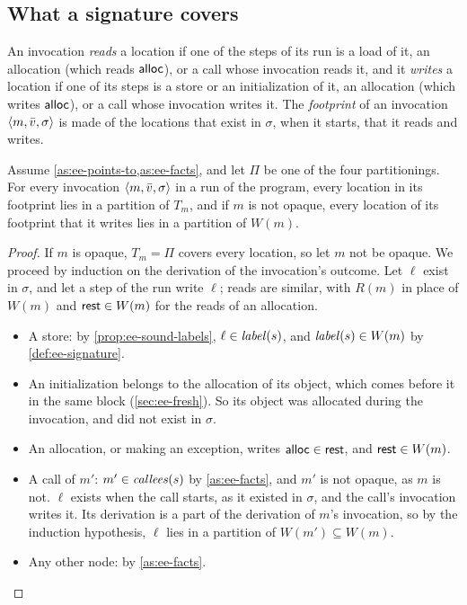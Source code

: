 \subsection{What a signature covers}

\begin{definition}[Footprint]\label{def:ee-footprint}
An invocation \emph{reads} a location if one of the steps of its run is a load
of it, an allocation (which reads $\mathsf{alloc}$), or a call whose invocation reads
it, and it \emph{writes} a location if one of its steps is a store or an
initialization of it, an allocation (which writes $\mathsf{alloc}$), or a call whose
invocation writes it. The \emph{footprint} of an invocation
$\langle m, \bar v, \sigma \rangle$ is made of the locations that exist in $\sigma$, when
it starts, that it reads and writes.
\end{definition}

\begin{theorem}[Signatures]\label{thm:ee-signatures}
Assume \cref{as:ee-points-to,as:ee-facts}, and let $\Pi$ be one of the four
partitionings. For every invocation $\langle m, \bar v, \sigma \rangle$ in a run of the
program, every location in its footprint lies in a partition of $T_m$, and if
$m$ is not opaque, every location of its footprint that it writes lies in a
partition of $W(m)$.
\end{theorem}

\begin{proof}
If $m$ is opaque, $T_m = \Pi$ covers every location, so let $m$ not be opaque.
We proceed by induction on the derivation of the invocation's outcome. Let
$\ell$ exist in $\sigma$, and let a step of the run write $\ell$; reads are
similar, with $R(m)$ in place of $W(m)$ and $\mathsf{rest} \in W(m)$ for the reads of an
allocation.
\begin{itemize}
\item A store: by \cref{prop:ee-sound-labels}, $\ell \in \mathit{label}(s)$, and
  $\mathit{label}(s) \in W(m)$ by \cref{def:ee-signature}.
\item An initialization belongs to the allocation of its object, which comes
  before it in the same block (\cref{sec:ee-fresh}). So its object was
  allocated during the invocation, and did not exist in $\sigma$.
\item An allocation, or making an exception, writes $\mathsf{alloc} \in \mathsf{rest}$, and $\mathsf{rest} \in W(m)$.
\item A call of $m'$: $m' \in \mathit{callees}(s)$ by \cref{as:ee-facts}, and $m'$ is
  not opaque, as $m$ is not. $\ell$ exists when the call starts, as it existed
  in $\sigma$, and the call's invocation writes it. Its derivation is a part of
  the derivation of $m$'s invocation, so by the induction hypothesis, $\ell$ lies
  in a partition of $W(m') \subseteq W(m)$.
\item Any other node: by \cref{as:ee-facts}. \qedhere
\end{itemize}
\end{proof}

